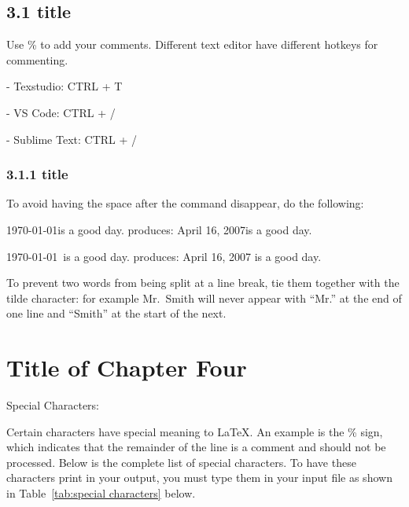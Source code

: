 \documentclass[12pt,openright]{book}
\begin{document}
\section{3.1 title}

Use \% to add your comments. Different text editor have different hotkeys for commenting.

- Texstudio: CTRL + T

- VS Code: CTRL + /

- Sublime Text: CTRL + /

\subsection{3.1.1 title}

To avoid having the space after the command disappear, do the following:

\today is a good day. produces: April 16, 2007is a good day.

\today\ is a good day. produces: April 16, 2007 is a good day.

To prevent two words from being split at a line break, tie them together with the tilde character: for example Mr.~Smith will never appear with “Mr.” at the end of one line and “Smith” at the start of the next.

\chapter{Title of Chapter Four}

Special Characters:

Certain characters have special meaning to \LaTeX. An example is the \% sign, which indicates that the remainder of the line is a comment and should not be processed. Below is the complete list of special characters. To have these characters print in your output, you must type them in your input file as shown in Table~\ref{tab:special characters} below.
\end{document}
